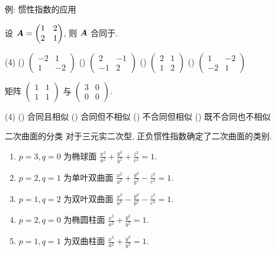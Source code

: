 \begin{frame}{例: 惯性指数的应用}
	\onslide<+->
	\begin{example}
		设 ${\boldsymbol{A}}=\begin{pmatrix}
			1&2\\2&1
		\end{pmatrix}$, 则 ${\boldsymbol{A}}$ 合同于.
		\begin{taskschoice}(4)
			() $\begin{pmatrix}-2&1\\1&-2\end{pmatrix}$
			() $\begin{pmatrix}2&-1\\-1&2\end{pmatrix}$
			() $\begin{pmatrix}2&1\\1&2\end{pmatrix}$
			() $\begin{pmatrix}1&-2\\-2&1\end{pmatrix}$
		\end{taskschoice}
	\end{example}
	\onslide
	\begin{example}
		矩阵 $\begin{pmatrix}
			1&1\\1&1
		\end{pmatrix}$ 与 $\begin{pmatrix}
			3&0\\0&0
		\end{pmatrix}$\fillbrace{\visible<+->{B}}.
		
		\begin{taskschoice}(4)
			() 合同且相似
			() 合同但不相似
			() 不合同但相似
			() 既不合同也不相似
		\end{taskschoice}
	\end{example}
\end{frame}


\begin{frame}{二次曲面的分类}
	\onslide<+->
	对于三元实二次型, 正负惯性指数确定了二次曲面的类别.
	\begin{enumerate}
		\item $p=3,q=0$ 为椭球面 $\displaystyle\frac{x^2}{a^2}+\frac{y^2}{b^2}+\frac{z^2}{c^2}=1$.
		\item $p=2,q=1$ 为单叶双曲面 $\displaystyle\frac{x^2}{a^2}+\frac{y^2}{b^2}-\frac{z^2}{c^2}=1$.
		\item $p=1,q=2$ 为双叶双曲面 $\displaystyle\frac{x^2}{a^2}-\frac{y^2}{b^2}-\frac{z^2}{c^2}=1$.
		\item $p=2,q=0$ 为椭圆柱面 $\displaystyle\frac{x^2}{a^2}+\frac{y^2}{b^2}=1$.
		\item $p=1,q=1$ 为双曲柱面 $\displaystyle\frac{x^2}{a^2}+\frac{y^2}{b^2}=1$.
	\end{enumerate}
\end{frame}


